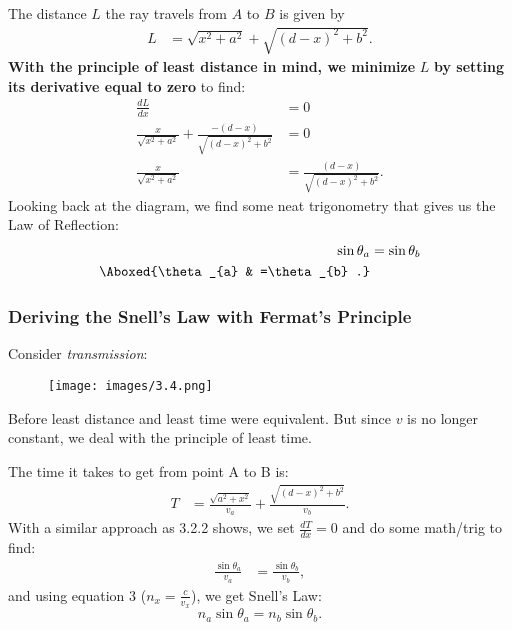 \documentclass{article}
\begin{document}
The distance $L$ the ray travels from $A$ to $B$ is given by
\begin{align*}
L & =\sqrt{x^{2} +a^{2}} +\sqrt{( d-x)^{2} +b^{2}} .
\end{align*}
\textbf{With the principle of least distance in mind, we minimize }$L$\textbf{ by setting its derivative equal to zero} to find:
\begin{align*}
\frac{dL}{dx} & =0\\
\frac{x}{\sqrt{x^{2} +a^{2}}} +\frac{-( d-x)}{\sqrt{( d-x)^{2} +b^{2}}} & =0\\
\frac{x}{\sqrt{x^{2} +a^{2}}} & =\frac{( d-x)}{\sqrt{( d-x)^{2} +b^{2}}} .
\end{align*}
Looking back at the diagram, we find some neat trigonometry that gives us the Law of Reflection:
\begin{align*}
\sin \theta _{a} & =\sin \theta _{b}\\
\Aboxed{\theta _{a} & =\theta _{b} .}
\end{align*}

\subsubsection{Deriving the Snell's Law with Fermat's Principle}

Consider \textit{transmission}:


\begin{figure}[htp]
    \centering
    \texttt{[image: images/3.4.png]}
\end{figure}

Before least distance and least time were equivalent. But since $v$ is no longer constant, we deal with the principle of least time. 



The time it takes to get from point A to B is:
\begin{align*}
T & =\frac{\sqrt{a^{2} +x^{2}}}{v_{a}} +\frac{\sqrt{( d-x)^{2} +b^{2}}}{v_{b}} .
\end{align*}
With a similar approach as 3.2.2 shows, we set $\tfrac{dT}{dx} =0$ and do some math/trig to find: 
\begin{align*}
\frac{\sin \theta _{a}}{v_{a}} & =\frac{\sin \theta _{b}}{v_{b}} ,
\end{align*}
and using equation 3 ($n_{x} =\tfrac{c}{v_{x}}$), we get Snell's Law:
\begin{equation*}
\boxed{n_{a}\sin \theta _{a} =n_{b}\sin \theta _{b} .}
\end{equation*}
\end{document}
